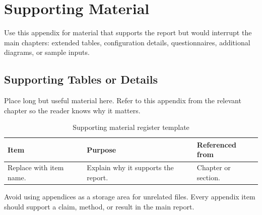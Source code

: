 \chapter{Supporting Material}
\label{app:supporting-material}

Use this appendix for material that supports the report but would interrupt the main chapters: extended tables, configuration details, questionnaires, additional diagrams, or sample inputs.


\section{Supporting Tables or Details}
Place long but useful material here. Refer to this appendix from the relevant chapter so the reader knows why it matters.

\begin{table}[H]
    \centering
    \caption{Supporting material register template}
    \label{tab:supporting-material-register-template}
    \small
    \begin{tabular}{L{0.24\textwidth}L{0.42\textwidth}L{0.22\textwidth}}
        \toprule
        \textbf{Item} & \textbf{Purpose} & \textbf{Referenced from} \\
        \midrule
        Replace with item name. & Explain why it supports the report. & Chapter or section. \\
        \bottomrule
    \end{tabular}
\end{table}

Avoid using appendices as a storage area for unrelated files. Every appendix item should support a claim, method, or result in the main report.